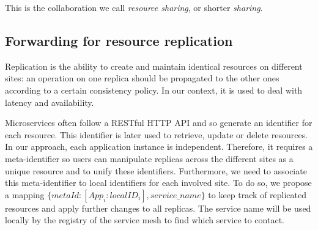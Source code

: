 This is the collaboration we call \emph{resource sharing}, or shorter
\emph{sharing}.


\subsection{Forwarding for resource replication}
\label{ssec:scl-rep}

Replication is the ability to create and maintain identical resources
on different sites: an operation on one replica should be propagated to
the other ones according to a certain consistency policy.
%
In our context, it is used to deal with latency and availability.


Microservices often follow a RESTful HTTP API and so generate an
identifier for each resource.
%
This identifier is later used to retrieve, update or delete resources.
%
In our approach, each application instance is independent.
%
Therefore, it requires a meta-identifier so users can manipulate
replicas across the different sites as a unique resource and to unify
these identifiers.
%
Furthermore, we need to associate this meta-identifier to local
identifiers for each involved site.
%
To do so, we propose a mapping
$\{ metaId: [App_i: localID_i], service\_name\}$ to keep track of
replicated resources and apply further changes to all replicas.
%
The service name will be used locally by the registry of the service
mesh to find which service to contact.

